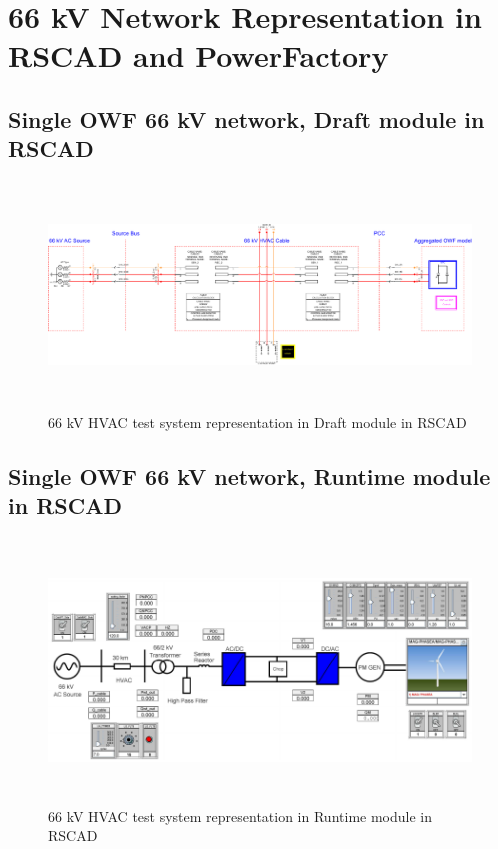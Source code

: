 \chapter{66 kV Network Representation in RSCAD and PowerFactory}

\section{Single OWF 66 kV network, Draft module in RSCAD}

\begin{figure}[H]
\centering
    \includegraphics[height = 6cm,width = \textwidth]{Diagrams/Appendix_B/WT1_AC_RSCAD_network_view.pdf}
    \caption{66 kV HVAC test system representation in Draft module in RSCAD}
    \label{fig:WT1_AC_RSCAD_network_view}
\end{figure}

\section{Single OWF 66 kV network, Runtime module in RSCAD}
\begin{figure}[H]
\centering
    \includegraphics[height = 7cm,width = 16.5cm]{Diagrams/Appendix_B/WT1_AC_RSCAD_network_sib_view.pdf}
    \caption{66 kV HVAC test system representation in Runtime module in RSCAD}
    \label{fig:WT1_AC_RSCAD_network_sib_view}
\end{figure}

